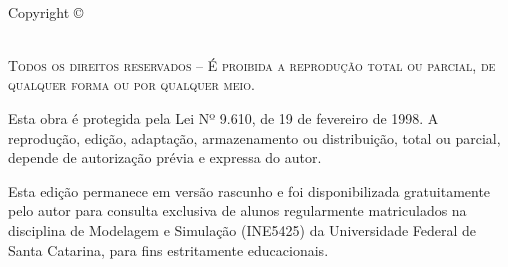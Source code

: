 
\newpage
~\vfill
\thispagestyle{empty}

\noindent Copyright \copyright\ \anolongo\ \nomeautor


\noindent {\websiteautor}\\ %

\noindent \textsc{Todos os direitos reservados -- É proibida a reprodução total ou parcial, de qualquer forma ou por qualquer meio.}

\noindent \small{Esta obra é protegida pela Lei Nº 9.610, de 19 de fevereiro de 1998. A reprodução, edição, adaptação, armazenamento ou distribuição, total ou parcial, depende de autorização prévia e expressa do autor.}

\noindent \small{Esta edição permanece em versão rascunho e foi disponibilizada gratuitamente pelo autor para consulta exclusiva de alunos regularmente matriculados na disciplina de Modelagem e Simulação (INE5425) da Universidade Federal de Santa Catarina, para fins estritamente educacionais.}

\noindent \textit{\\\datalonga} %
